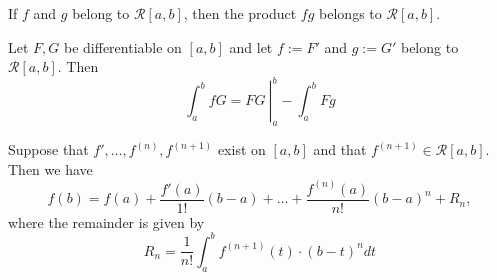 \begin{theorem}
	If $f$ and $g$ belong to $\mathcal{R}[a,b]$, then the product $fg$ belongs to $\mathcal{R}[a,b]$.
\end{theorem}

\begin{theorem}
	Let $F,G$ be differentiable on $[a,b]$ and let $f:=F'$ and $g:=G'$ belong to $\mathcal{R}[a,b]$. Then
	\[\left.\displaystyle\int_{a}^{b}fG=FG\ \right|_a^b-\displaystyle\int_{a}^{b}Fg\]
\end{theorem}

\begin{theorem}
	Suppose that $f',\dots,f^{(n)},f^{(n+1)}$ exist on $[a,b]$ and that $f^{(n+1)} \in \mathcal{R}[a,b]$. Then we have
	\[f(b)=f(a)+\frac{f'(a)}{1!}(b-a)+\dots+\frac{f^{(n)}(a)}{n!}(b-a)^n+R_n,\]
	where the remainder is given by
	\[R_n=\frac{1}{n!}\displaystyle\int_{a}^{b}f^{(n+1)}(t)\cdot(b-t)^n dt\]
\end{theorem}
